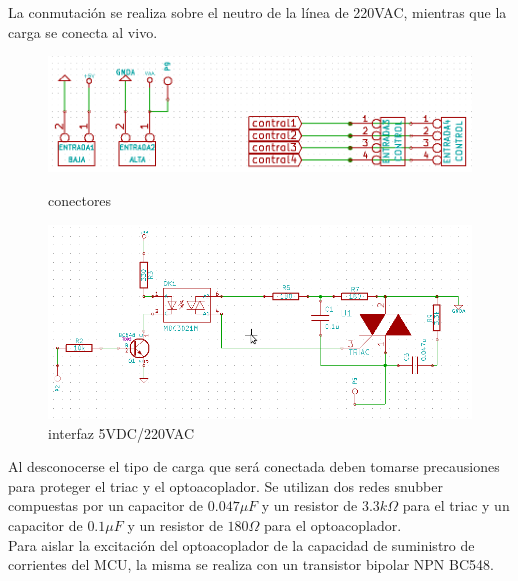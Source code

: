 \documentclass[a4paper,12pt]{article}
\begin{document}
La conmutación se realiza sobre el neutro de la línea de 220VAC, mientras que la carga se conecta al vivo.\\


\begin{figure}[ht]
	\begin{minipage}[b]{0.45\linewidth}
		\centering
		\includegraphics[width=\textwidth]{./imagenes/potencia-schema1.png}
		\caption{conectores}
		\label{fig:figure1}
	\end{minipage}
	\hspace{0.5cm}
	\begin{minipage}[b]{0.45\linewidth}
		\centering
		\includegraphics[width=\textwidth]{./imagenes/potencia-schema2.png}
		\caption{interfaz 5VDC/220VAC}
		\label{fig:figure2}
	\end{minipage}
\end{figure}

Al desconocerse el tipo de carga que será conectada deben tomarse precausiones para proteger el triac y el optoacoplador. Se utilizan dos redes snubber compuestas por un capacitor de $0.047\mu F$ y un resistor de $3.3k\Omega$ para el triac y un capacitor de $0.1\mu F$ y un resistor de $180\Omega$ para el optoacoplador.\\

Para aislar la excitación del optoacoplador de la capacidad de suministro de corrientes del MCU, la misma se realiza con un transistor bipolar NPN BC548.\\
\end{document}
